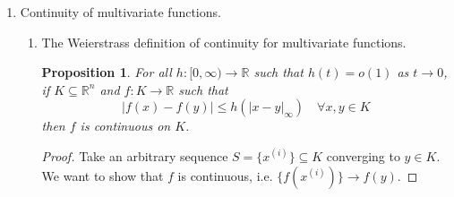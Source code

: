 \documentclass[letterpaper,11pt]{article}
\newtheorem{prop}{Proposition}
\newcommand{\R}{\mathbb{R}}
\begin{document}
\begin{enumerate}
\begin{proof}
\begin{enumerate}
                    In the first case, the polynomial is above both exponential
                    curves as $t \to 0$, since the exponential curves approach
                    $0$ exponentially fast, must faster than $ct^n$. Hence the
                    limit along the polynomial curve is again $0$, which
                    corresponds with the function value at $(0, 0)$. Thus $u$
                    is continuous along this polynomial curve as well.

                    In the second case, there is nothing to show since the
                    polynomial is negative and does not interact whatsoever
                    with the exponential curves. Again the limit value will
                    correspond with the function value, so $u$ is continuous
                    along this curve.
            \end{enumerate}

            Thus, since the choice of $p(t)$ was arbitrary, we can generalize
            to all polynomial curves; the function $u$ we have constructed is
            discontinuous at $0 \in \R^2$, but is continuous along any
            polynomial curve through the origin.
        \end{proof}

    \item Continuity of multivariate functions.

        \begin{enumerate}
            \item The Weierstrass definition of continuity for multivariate
                functions.

                \begin{prop}
                    For all $h : [0, \infty) \to \R$ such that $h(t) = o(1)$ as
                    $t \to 0$, if $K \subseteq \R^n$ and $f : K \to \R$ such
                    that
                    \begin{equation*}
                        |f(x) - f(y)| \leq h(|x - y|_\infty)
                        \quad \forall x, y \in K
                    \end{equation*}
                    then $f$ is continuous on $K$.
                \end{prop}

                \begin{proof}
                    Take an arbitrary sequence $S = \{x^{(i)}\} \subseteq K$
                    converging to $y \in K$. We want to show that $f$ is
                    continuous, i.e.  $\{f(x^{(i)})\} \to f(y)$.


\end{proof}
\end{enumerate}
\end{enumerate}
\end{document}
